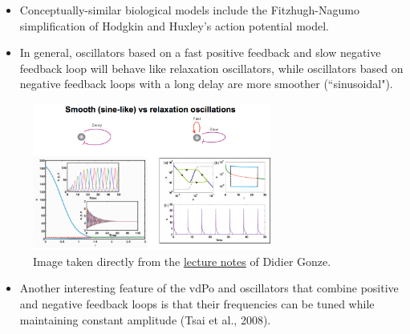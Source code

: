 \documentclass{article}
\begin{document}
\begin{itemize}
\item Conceptually-similar biological models include the Fitzhugh-Nagumo simplification of Hodgkin and Huxley's action potential model.

\item In general, oscillators based on a fast positive feedback and slow negative feedback loop will behave like relaxation oscillators, while oscillators based on negative feedback loops with a long delay are more smoother (``sinusoidal").

\end{itemize}

\begin{figure}
\begin{center}
\includegraphics[width=0.7\textwidth]{gonze.png}
\caption{Image taken directly from the \href{http://homepages.ulb.ac.be/~dgonze/TEACHING/osc_design.pdf}{lecture notes} of Didier Gonze.}
\end{center}
\end{figure}

\begin{itemize}


\item Another interesting feature of the vdPo and oscillators that combine positive and negative feedback loops is that their frequencies can be tuned while maintaining constant amplitude (Tsai et al., 2008).
\end{itemize}
\end{document}

